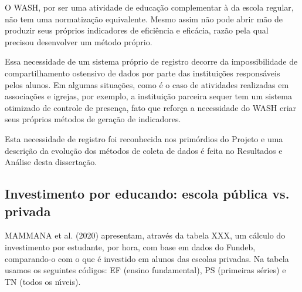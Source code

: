 \documentclass[
12pt,		%
openright,	%
twoside,  %
a4paper,			%
chapter=TITLE,		%
english,			%
french,				%
spanish,			%
brazil				%
]{USPSC-classe/USPSC}
\begin{document}
O WASH, por ser uma atividade de educa\c{c}\~ao complementar \`a da escola regular, n\~ao tem uma normatiza\c{c}\~ao equivalente. Mesmo assim n\~ao pode abrir m\~ao de produzir seus pr\'oprios indicadores de efici\^encia e efic\'acia, raz\~ao pela qual  precisou desenvolver um m\'etodo pr\'oprio.




Essa necessidade de um sistema pr\'oprio de registro decorre da impossibilidade de compartilhamento ostensivo de dados por parte das institui\c{c}\~oes respons\'aveis pelos alunos. Em algumas situa\c{c}\~oes, como \'e o caso de atividades realizadas em associa\c{c}\~oes e igrejas, por exemplo, a institui\c{c}\~ao parceira sequer tem um sistema otimizado de controle de presen\c{c}a, fato que refor\c{c}a a necessidade do WASH criar seus pr\'oprios m\'etodos de gera\c{c}\~ao de indicadores.




Esta necessidade de registro foi reconhecida nos prim\'ordios do Projeto e uma descri\c{c}\~ao da evolu\c{c}\~ao dos m\'etodos de coleta de dados \'e feita no Resultados e An\'alise desta disserta\c{c}\~ao.




\subsection[Investimento por educando: escola p\'ublica vs. privada]{Investimento por educando: escola p\'ublica vs. privada}\label{Investimento por educando: escola p\'ublica vs. privada}
MAMMANA et al. (2020)  apresentam, atrav\'es da tabela XXX, um c\'alculo do investimento por estudante, por hora, com base em dados do Fundeb, comparando-o com o que \'e investido em alunos das escolas privadas. Na tabela usamos os seguintes c\'odigos: EF (ensino fundamental), PS (primeiras s\'eries) e TN (todos os n\'{\i}veis).
\end{document}
